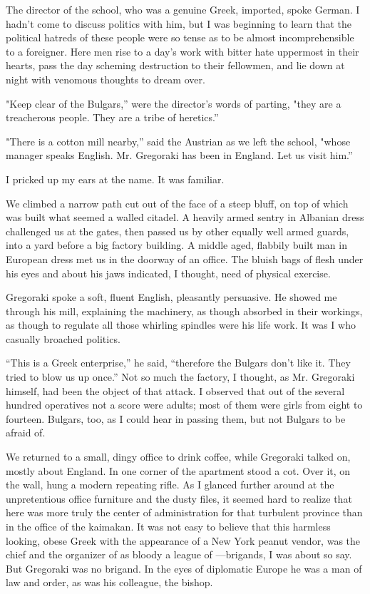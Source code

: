 \documentclass[a5paper,12pt]{book}
\begin{document}
The director of the school, who was a genuine Greek, imported, spoke German. I hadn’t come to discuss politics with him, but I was beginning to learn that the political hatreds of these people were so tense as to be almost incomprehensible to a foreigner. Here men rise to a day’s work with bitter hate uppermost in their hearts, pass the day scheming destruction to their fellowmen, and lie down at night with venomous thoughts to dream over. 

"Keep clear of the Bulgars,” were the director’s words of parting, "they are a treacherous people. They are a tribe of heretics.” 

"There is a cotton mill nearby,” said the Austrian as we left the school, "whose manager speaks English. Mr. Gregoraki has been in England. Let us visit him.” 

I pricked up my ears at the name. It was familiar. 

We climbed a narrow path cut out of the face of a steep bluff, on top of which was built what seemed a walled citadel. A heavily armed sentry in Albanian dress challenged us at the gates, then passed us by other equally well armed guards, into a yard before a big factory building. A middle aged, flabbily built man in European dress met us in the doorway of an office. The bluish bags of flesh under his eyes and about his jaws indicated, I thought, need of physical exercise. 

Gregoraki spoke a soft, fluent English, pleasantly persuasive. He showed me through his mill, explaining the machinery, as though absorbed in their workings, as though to regulate all those whirling spindles were his life work. It was I who casually broached politics. 

“This is a Greek enterprise,” he said, “therefore the Bulgars don't like it. They tried to blow us up once.” Not so much the factory, I thought, as Mr. Gregoraki himself, had been the object of that attack. I observed that out of the several hundred operatives not a score were adults; most of them were girls from eight to fourteen. Bulgars, too, as I could hear in passing them, but not Bulgars to be afraid of. 

We returned to a small, dingy office to drink coffee, while Gregoraki talked on, mostly about England. In one corner of the apartment stood a cot. Over it, on the wall, hung a modern repeating rifle. As I glanced further around at the unpretentious office furniture and the dusty files, it seemed hard to realize that here was more truly the center of administration for that turbulent province than in the office of the kaimakan. It was not easy to believe that this harmless looking, obese Greek with the appearance of a New York peanut vendor, was the chief and the organizer of as bloody a league of —brigands, I was about so say. But Gregoraki was no brigand. In the eyes of diplomatic Europe he was a man of law and order, as was his colleague, the bishop. 
\end{document}

